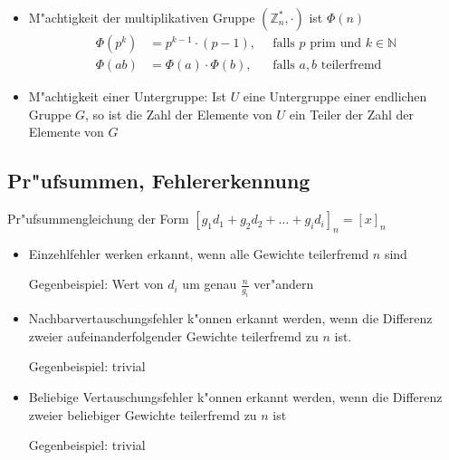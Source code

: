 \documentclass[fleqn,12pt]{scrartcl}
\begin{document}
\begin{itemize}
			\item
				M"achtigkeit der multiplikativen Gruppe $(\mathbb{Z}^*_n, \cdot)$ ist $\Phi(n)$ 
				\begin{align*}
					\Phi(p^k) &= p^{k-1} \cdot (p-1),\, &\text{ falls  $p$ prim und $k \in \mathbb{N}$} \\
					\Phi(ab) &= \Phi(a) \cdot \Phi(b), \, &\text{ falls $a,b$ teilerfremd}
				\end{align*}

			\item
				M"achtigkeit einer Untergruppe: Ist $U$ eine Untergruppe einer endlichen Gruppe $G$, so ist die Zahl der Elemente von $U$ ein Teiler der Zahl der Elemente von $G$
		\end{itemize}




		\subsection{Pr"ufsummen, Fehlererkennung}
		Pr"ufsummengleichung der Form $[g_1d_1 + g_2d_2 + \dots + g_id_i]_n = [x]_n$
		\begin{itemize}
			\item
				Einzehlfehler werken erkannt, wenn alle Gewichte teilerfremd $n$ sind

				Gegenbeispiel: Wert von $d_i$ um genau $\frac{n}{g_i}$ ver"andern
			\item
				Nachbarvertauschungsfehler k"onnen erkannt werden, wenn die Differenz zweier aufeinanderfolgender Gewichte teilerfremd zu $n$ ist.

				Gegenbeispiel: trivial

			\item
				Beliebige Vertauschungsfehler k"onnen erkannt werden, wenn die Differenz zweier beliebiger Gewichte teilerfremd zu $n$ ist

				Gegenbeispiel: trivial
		\end{itemize}




\printindex
\end{document}
